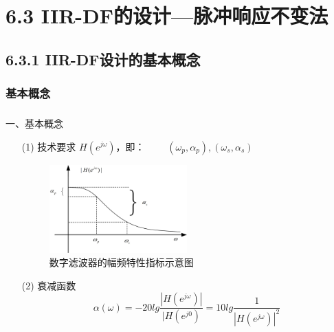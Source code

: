 \documentclass[notheorems,compress,mathserif,table]{beamer}
\begin{document}
\section{6.3 IIR-DF的设计—脉冲响应不变法}

\subsection{6.3.1 IIR-DF设计的基本概念}
\subsubsection*{基本概念}
\begin{frame}[shrink]\frametitle{}%
{\heiti 一、基本概念}
\begin{enumerate}
  \item [(1)]
    技术要求 $H(e^{j\omega})$，即：    $\quad\quad(\omega_p,\alpha_p),(\omega_s,\alpha_s)$
    \begin{figure}[h]
    \centering
    \includegraphics[width=0.5\textwidth]{fig9_lpdfjszb.jpg}
    \caption{数字滤波器的幅频特性指标示意图}
    \end{figure}
  \item [(2)] 衰减函数
  $$\alpha(\omega)=-20lg\frac{|H(e^{j\omega})|}{|H(e^{j0})}= 10lg\frac{1}{|H(e^{j\omega})|^2}$$
\end{enumerate}
\end{frame}
%
%
\end{document}
